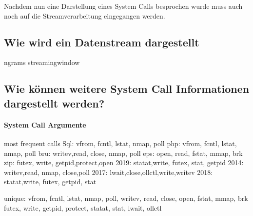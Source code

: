         Nachdem nun eine Darstellung eines System Calls besprochen wurde muss auch noch auf die Streamverarbeitung eingegangen werden.

    \subsection{Wie wird ein Datenstream dargestellt}
        ngrams
        streamingwindow

    \subsection{Wie können weitere System Call Informationen dargestellt werden?}
        \paragraph{System Call Argumente}  
            most frequent calls
            Sql: vfrom, fcntl, lstat, nmap, poll
            php: vfrom, fcntl, lstat, nmap, poll
            bru: writev,read,  close, nmap, poll
            eps: open,  read,  fstat, mmap, brk
            zip: futex, write, getpid,protect,open
            2019: statat,write, futex, stat, getpid
            2014: writev,read,  nmap,  close,poll
            2017: lwait,close,ollctl,write,writev
            2018: statat,write, futex, getpid, stat


            unique:
                vfrom, fcntl, lstat, nmap, poll, writev, read, close, open, fstat, mmap, brk
                futex, write, getpid, protect, statat, stat, lwait, ollctl

